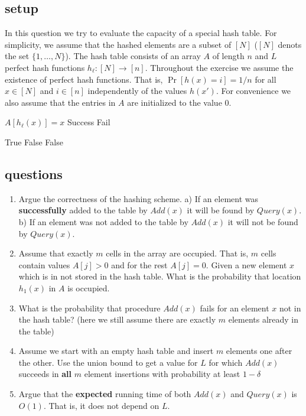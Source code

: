 \documentclass{article}
\begin{document}
\subsection*{setup}
In this question we try to evaluate the capacity of a special hash table.
For simplicity, we assume that the hashed elements are a subset of $[N]$ ($[N]$ denots the set $\{1,\dots,N\}$).
The hash table consists of an array $A$ of length $n$ and $L$ perfect hash functions $h_\ell: [N] \rightarrow [n]$.
Throughout the exercise we assume the existence of perfect hash functions. That is, $\Pr[h(x) = i] = 1/n$ for all $x \in [N]$ and $i\in [n]$ 
independently of the values $h(x')$.  For convenience we also assume that the entries in $A$ are initialized to the value $0$.
%
\begin{algorithm}
\caption{$Add(x)$}
\begin{algorithmic}
\FOR {$\ell \in [L]$}
    	\STATE $A[h_\ell(x)] = x$
	\STATE \RETURN Success
    \ENDIF
\ENDFOR
\STATE \RETURN Fail
\end{algorithmic}
\end{algorithm}
%
\vspace{-.6cm}
\begin{algorithm}
\caption{$Query(x)$}
\begin{algorithmic}
\FOR {$\ell \in [L]$}
	\STATE \RETURN True
   	\STATE \RETURN False
    \ENDIF
\ENDFOR
\STATE \RETURN False
\end{algorithmic}
\end{algorithm}
%
\vspace{-.6cm}
\subsection*{questions}
\begin{enumerate}
\item Argue the correctness of the hashing scheme. 
a) If an element was {\bf successfully} added to the table by $Add(x)$ it will be found by $Query(x)$. 
b) If an element was not added to the table by $Add(x)$ it will not be found by $Query(x)$. 
\item Assume that exactly $m$ cells in the array are occupied. That is, $m$ cells contain values $A[j] > 0$ and for the rest $A[j]=0$.
Given a new element $x$ which is in not stored in the hash table. What is the probability that location $h_1(x)$ in $A$ is occupied.
\item What is the probability that procedure $Add(x)$ fails for an element $x$ not in the hash table? (here we still assume there are exactly $m$ elements already in the table)
\item Assume we start with an empty hash table and insert $m$ elements one after the other. 
Use the union bound to get a value for $L$ for which $Add(x)$ succeeds in {\bf all} $m$ element insertions with probability at least $1-\delta$
\item Argue that the {\bf expected} running time of both $Add(x)$ and $Query(x)$ is $O(1)$. That is, it does not depend on $L$. 
\end{enumerate}


\end{document}
